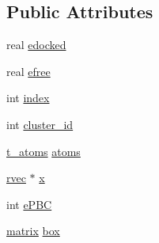 \subsection*{\-Public \-Attributes}
\begin{DoxyCompactItemize}
\item 
real \hyperlink{structt__pdbfile_a52daa1ed729a42ed52302993ca707b7a}{edocked}
\item 
real \hyperlink{structt__pdbfile_a9b8e5f9f03160157aad99c528c6b4534}{efree}
\item 
int \hyperlink{structt__pdbfile_ad20e23a95c2ec717a8543ae1a7ec8019}{index}
\item 
int \hyperlink{structt__pdbfile_a2e7eec4f6c90531aab936fd83c3170b6}{cluster\-\_\-id}
\item 
\hyperlink{structt__atoms}{t\-\_\-atoms} \hyperlink{structt__pdbfile_a574712ac174331a120f97ff8fc9a78a6}{atoms}
\item 
\hyperlink{share_2template_2gromacs_2types_2simple_8h_aa02a552a4abd2f180c282a083dc3a999}{rvec} $\ast$ \hyperlink{structt__pdbfile_a0a97cedf9e09ba09790f33592d976683}{x}
\item 
int \hyperlink{structt__pdbfile_a3e7fe0d986ad99f9e59dd7724545a7d8}{e\-P\-B\-C}
\item 
\hyperlink{share_2template_2gromacs_2types_2simple_8h_a7ea9c2a830d3f743b887387e33645a83}{matrix} \hyperlink{structt__pdbfile_a7dbe641aeebaf4f8dbc499fa9327258b}{box}
\end{DoxyCompactItemize}


